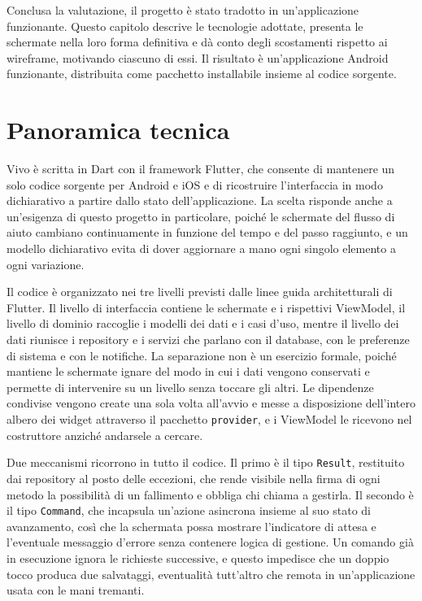Conclusa la valutazione, il progetto è stato tradotto in un'applicazione funzionante.
Questo capitolo descrive le tecnologie adottate, presenta le schermate nella loro forma definitiva e dà conto degli scostamenti rispetto ai wireframe, motivando ciascuno di essi.
Il risultato è un'applicazione Android funzionante, distribuita come pacchetto installabile insieme al codice sorgente.

\section{Panoramica tecnica}
\label{sec:panoramica-tecnica}

Vivo è scritta in Dart con il framework Flutter, che consente di mantenere un solo codice sorgente per Android e iOS e di ricostruire l'interfaccia in modo dichiarativo a partire dallo stato dell'applicazione.
La scelta risponde anche a un'esigenza di questo progetto in particolare, poiché le schermate del flusso di aiuto cambiano continuamente in funzione del tempo e del passo raggiunto, e un modello dichiarativo evita di dover aggiornare a mano ogni singolo elemento a ogni variazione.

Il codice è organizzato nei tre livelli previsti dalle linee guida architetturali di Flutter.
Il livello di interfaccia contiene le schermate e i rispettivi ViewModel, il livello di dominio raccoglie i modelli dei dati e i casi d'uso, mentre il livello dei dati riunisce i repository e i servizi che parlano con il database, con le preferenze di sistema e con le notifiche.
La separazione non è un esercizio formale, poiché mantiene le schermate ignare del modo in cui i dati vengono conservati e permette di intervenire su un livello senza toccare gli altri.
Le dipendenze condivise vengono create una sola volta all'avvio e messe a disposizione dell'intero albero dei widget attraverso il pacchetto \texttt{provider}, e i ViewModel le ricevono nel costruttore anziché andarsele a cercare.

Due meccanismi ricorrono in tutto il codice.
Il primo è il tipo \texttt{Result}, restituito dai repository al posto delle eccezioni, che rende visibile nella firma di ogni metodo la possibilità di un fallimento e obbliga chi chiama a gestirla.
Il secondo è il tipo \texttt{Command}, che incapsula un'azione asincrona insieme al suo stato di avanzamento, così che la schermata possa mostrare l'indicatore di attesa e l'eventuale messaggio d'errore senza contenere logica di gestione.
Un comando già in esecuzione ignora le richieste successive, e questo impedisce che un doppio tocco produca due salvataggi, eventualità tutt'altro che remota in un'applicazione usata con le mani tremanti.

